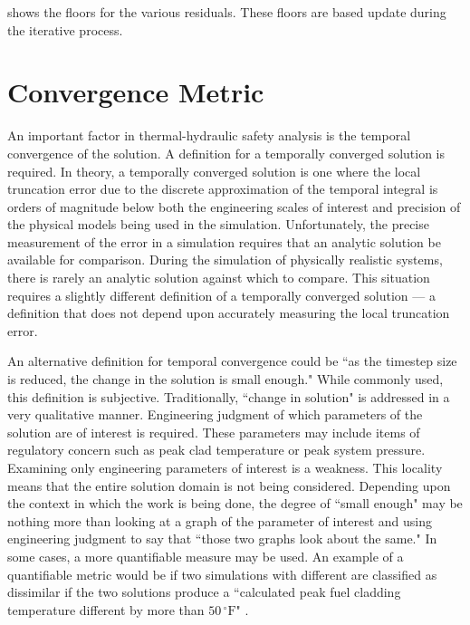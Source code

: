  shows the floors for the various residuals.
These floors are based update during the iterative process.

\section{Convergence Metric}
\label{sect:temporal_convergence}

An important factor in thermal-hydraulic safety analysis is the temporal convergence of the solution.
A definition for a temporally converged solution is required.
In theory, a temporally converged solution is one where the local truncation error due to the discrete approximation of the temporal integral is orders of magnitude below both the engineering scales of interest and precision of the physical models being used in the simulation.
Unfortunately, the precise measurement of the error in a simulation requires that an analytic solution be available for comparison.
During the simulation of physically realistic systems, there is rarely an analytic solution against which to compare.
This situation requires a slightly different definition of a temporally converged solution --- a definition that does not depend upon accurately measuring the local truncation error.

An alternative definition for temporal convergence could be ``as the timestep size is reduced, the change in the solution is small enough."
While commonly used, this definition is subjective.
Traditionally, ``change in solution" is addressed in a very qualitative manner.
Engineering judgment of which parameters of the solution are of interest is required.
These parameters may include items of regulatory concern such as peak clad temperature or peak system pressure.
Examining only engineering parameters of interest is a weakness.
This locality means that the entire solution domain is not being considered.
Depending upon the context in which the work is being done, the degree of ``small enough" may be nothing more than looking at a graph of the parameter of interest and using engineering judgment to say that ``those two graphs look about the same."
In some cases, a more quantifiable measure may be used.
An example of a quantifiable metric would be if two simulations with different \dtmax{} are classified as dissimilar if the two solutions produce a ``calculated peak fuel cladding temperature different by more than $50\,^{\circ}\mathrm{F}$" \cite{CFR10}.

